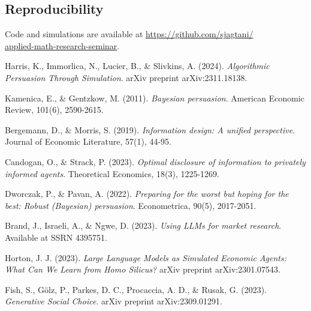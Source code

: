 \documentclass[12pt]{article}
\theoremstyle{plain}
\theoremstyle{definition}
\theoremstyle{remark}
\begin{document}
\subsection{Reproducibility}

Code and simulations are available at \url{https://github.com/sjagtani/}\\ 
\url{applied-math-research-seminar}.


\begin{thebibliography}{8}

Harris, K., Immorlica, N., Lucier, B., \& Slivkins, A. (2024).
\textit{Algorithmic Persuasion Through Simulation}.
arXiv preprint arXiv:2311.18138.

Kamenica, E., \& Gentzkow, M. (2011).
\textit{Bayesian persuasion}.
American Economic Review, 101(6), 2590-2615.

Bergemann, D., \& Morris, S. (2019).
\textit{Information design: A unified perspective}.
Journal of Economic Literature, 57(1), 44-95.

Candogan, O., \& Strack, P. (2023).
\textit{Optimal disclosure of information to privately informed agents}.
Theoretical Economics, 18(3), 1225-1269.

Dworczak, P., \& Pavan, A. (2022).
\textit{Preparing for the worst but hoping for the best: Robust (Bayesian) persuasion}.
Econometrica, 90(5), 2017-2051.

Brand, J., Israeli, A., \& Ngwe, D. (2023).
\textit{Using LLMs for market research}.
Available at SSRN 4395751.

Horton, J. J. (2023).
\textit{Large Language Models as Simulated Economic Agents: What Can We Learn from Homo Silicus?}
arXiv preprint arXiv:2301.07543.

Fish, S., G\"{o}lz, P., Parkes, D. C., Procaccia, A. D., \& Rusak, G. (2023).
\textit{Generative Social Choice}.
arXiv preprint arXiv:2309.01291.

\end{thebibliography}
\end{document}
